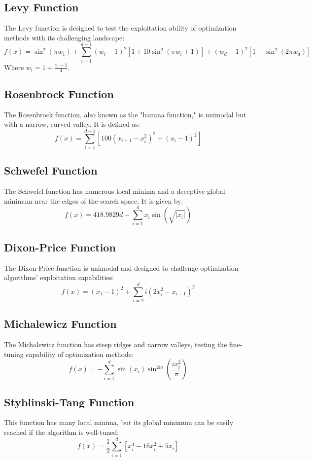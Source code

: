 \documentclass[12pt]{article}
\begin{document}
\subsection{Levy Function}
The Levy function is designed to test the exploitation ability of optimization methods with its challenging landscape:
\[
f(x) = \sin^2(\pi w_1) + \sum_{i=1}^{d-1} (w_i-1)^2[1+10\sin^2(\pi w_i+1)] + (w_d-1)^2[1+\sin^2(2\pi w_d)]
\]
Where \( w_i = 1 + \frac{x_i - 1}{4} \).

\subsection{Rosenbrock Function}
The Rosenbrock function, also known as the "banana function," is unimodal but with a narrow, curved valley. It is defined as:
\[
f(x) = \sum_{i=1}^{d-1} \left[100(x_{i+1} - x_i^2)^2 + (x_i - 1)^2\right]
\]

\subsection{Schwefel Function}
The Schwefel function has numerous local minima and a deceptive global minimum near the edges of the search space. It is given by:
\[
f(x) = 418.9829d - \sum_{i=1}^d x_i \sin\left(\sqrt{|x_i|}\right)
\]

\subsection{Dixon-Price Function}
The Dixon-Price function is unimodal and designed to challenge optimization algorithms' exploitation capabilities:
\[
f(x) = (x_1 - 1)^2 + \sum_{i=2}^d i (2x_i^2 - x_{i-1})^2
\]

\subsection{Michalewicz Function}
The Michalewicz function has steep ridges and narrow valleys, testing the fine-tuning capability of optimization methods:
\[
f(x) = - \sum_{i=1}^d \sin(x_i) \sin^{2m}\left(\frac{ix_i^2}{\pi}\right)
\]

\subsection{Styblinski-Tang Function}
This function has many local minima, but its global minimum can be easily reached if the algorithm is well-tuned:
\[
f(x) = \frac{1}{2} \sum_{i=1}^d \left[x_i^4 - 16x_i^2 + 5x_i\right]
\]
\end{document}
